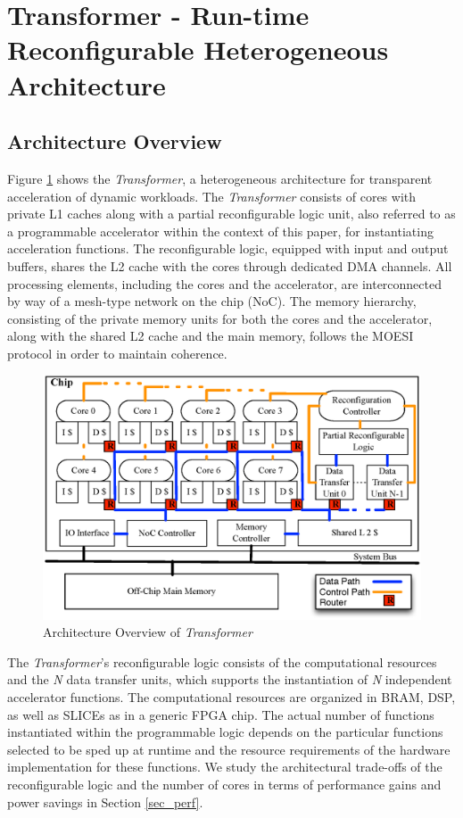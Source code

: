 \section{Transformer - Run-time Reconfigurable Heterogeneous Architecture}
\label{sec_arch}


\subsection{Architecture Overview}

Figure \ref{fig_arch} shows the {\em Transformer}, a heterogeneous
architecture for transparent acceleration of dynamic
workloads. The {\em Transformer} consists of cores with private L1 caches along with a
partial reconfigurable logic unit, also referred to as a programmable
accelerator within the context of this paper, for instantiating acceleration
functions. The reconfigurable logic, equipped with input and output
buffers, shares the L2 cache with the cores through dedicated DMA
channels. All processing elements, including the cores and the accelerator, are
interconnected by way of a mesh-type network on the chip (NoC). The memory
hierarchy, consisting of the private memory units for both the cores and the accelerator,
 along with the shared L2 cache and the main memory, follows the MOESI protocol in order to maintain
coherence.

\begin{figure}
    \centering
    \includegraphics[width=4.0 in]{HPCA14-arch}
    \caption{Architecture Overview of {\em Transformer} }
    \label{fig_arch}
\vspace{-0.05in}
\end{figure}

The {\em Transformer}'s reconfigurable logic consists of the computational resources
and the {\em N} data transfer
units, which supports the instantiation of {\em N} independent accelerator
functions. The computational resources are organized in BRAM, DSP,
as well as SLICEs as in a generic FPGA chip. The actual number of functions instantiated within the
programmable logic depends on the particular functions selected to be
sped up at runtime and the resource requirements of the hardware
implementation for these functions. We study the architectural trade-offs of 
the reconfigurable logic and the number of cores in terms of performance
gains and power savings in Section \ref{sec_perf}.

